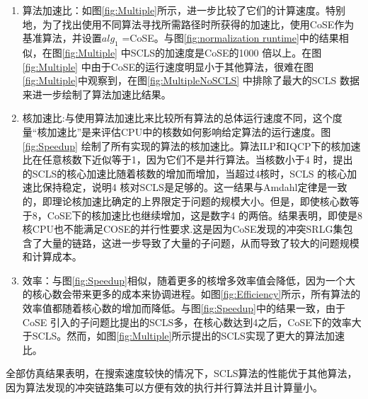 \begin{enumerate}
   \item   算法加速比：如图\ref{fig:Multiple}所示，进一步比较了它们的计算速度。特别地，为了找出使用不同算法寻找所需路径时所获得的加速比，使用CoSE作为基准算法，并设置$alg_1$ =CoSE。与图\ref{fig:normalization runtime}中的结果相似，在图\ref{fig:Multiple} 中SCLS的加速度是CoSE的1000 倍以上。在图\ref{fig:Multiple} 中由于CoSE的运行速度明显小于其他算法，很难在图\ref{fig:Multiple}中观察到，在图\ref{fig:MultipleNoSCLS} 中排除了最大的SCLS 数据来进一步绘制了算法加速比结果。
   \item 核加速比:与使用算法加速比来比较所有算法的总体运行速度不同，这个度量“核加速比”是来评估CPU中的核数如何影响给定算法的运行速度。图\ref{fig:Speedup} 绘制了所有实现的算法的核加速比。算法ILP和IQCP下的核加速比在任意核数下近似等于1，因为它们不是并行算法。当核数小于4 时，提出的SCLS的核心加速比随着核数的增加而增加，当超过4核时，SCLS 的核心加速比保持稳定，说明4 核对SCLS是足够的。这一结果与Amdahl定律\cite{amdahl1967validity}是一致的，即理论核加速比确定的上界限定于问题的规模大小。但是，即使核心数等于8，CoSE下的核加速比也继续增加，这是数字4 的两倍。结果表明，即使是8核CPU也不能满足COSE的并行性要求.这是因为CoSE发现的冲突SRLG集包含了大量的链路，这进一步导致了大量的子问题，从而导致了较大的问题规模和计算成本。
    \item 效率：与图\ref{fig:Speedup}相似，随着更多的核增多效率值会降低，因为一个大的核心数会带来更多的成本来协调进程。如图\ref{fig:Efficiency}所示，所有算法的效率值都随着核心数的增加而降低。与图\ref{fig:Speedup}中的结果一致，由于CoSE 引入的子问题比提出的SCLS多，在核心数达到4之后，CoSE下的效率大于SCLS。然而，如图\ref{fig:Multiple}所示提出的SCLS实现了更大的算法加速比。
\end{enumerate}

全部仿真结果表明，在搜索速度较快的情况下，SCLS算法的性能优于其他算法，因为算法发现的冲突链路集可以方便有效的执行并行算法并且计算量小。

